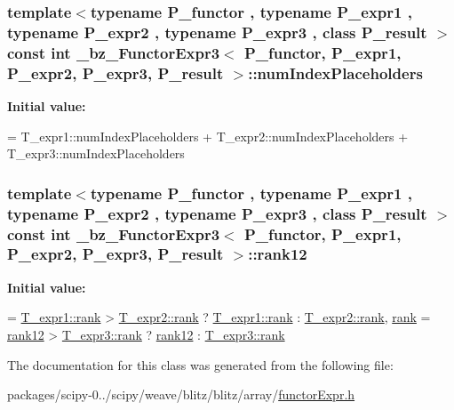 \subsubsection[{num\+Index\+Placeholders}]{\setlength{\rightskip}{0pt plus 5cm}template$<$typename P\+\_\+functor , typename P\+\_\+expr1 , typename P\+\_\+expr2 , typename P\+\_\+expr3 , class P\+\_\+result $>$ const int {\bf \+\_\+bz\+\_\+\+Functor\+Expr3}$<$ P\+\_\+functor, P\+\_\+expr1, P\+\_\+expr2, P\+\_\+expr3, P\+\_\+result $>$\+::num\+Index\+Placeholders\hspace{0.3cm}{\ttfamily [static]}}\label{class__bz__FunctorExpr3_a629b44040bfa7c287de36ccaf4a271ad}
{\bfseries Initial value\+:}
\begin{DoxyCode}
= T\_expr1::numIndexPlaceholders
                         + T\_expr2::numIndexPlaceholders
                         + T\_expr3::numIndexPlaceholders
\end{DoxyCode}
\hypertarget{class__bz__FunctorExpr3_a7587f3bcbc2d66a723cb9a62075b42fd}{}
\subsubsection[{rank12}]{\setlength{\rightskip}{0pt plus 5cm}template$<$typename P\+\_\+functor , typename P\+\_\+expr1 , typename P\+\_\+expr2 , typename P\+\_\+expr3 , class P\+\_\+result $>$ const int {\bf \+\_\+bz\+\_\+\+Functor\+Expr3}$<$ P\+\_\+functor, P\+\_\+expr1, P\+\_\+expr2, P\+\_\+expr3, P\+\_\+result $>$\+::rank12\hspace{0.3cm}{\ttfamily [static]}}\label{class__bz__FunctorExpr3_a7587f3bcbc2d66a723cb9a62075b42fd}
{\bfseries Initial value\+:}
\begin{DoxyCode}
= \hyperlink{zfftnd_8c_a6cfd95afd0afebd625b889fb6e58371c}{T\_expr1::rank} > \hyperlink{zfftnd_8c_a6cfd95afd0afebd625b889fb6e58371c}{T\_expr2::rank}
           ? \hyperlink{zfftnd_8c_a6cfd95afd0afebd625b889fb6e58371c}{T\_expr1::rank} : \hyperlink{zfftnd_8c_a6cfd95afd0afebd625b889fb6e58371c}{T\_expr2::rank},
    \hyperlink{zfftnd_8c_a6cfd95afd0afebd625b889fb6e58371c}{rank} = \hyperlink{class__bz__FunctorExpr3_a7587f3bcbc2d66a723cb9a62075b42fd}{rank12} > \hyperlink{zfftnd_8c_a6cfd95afd0afebd625b889fb6e58371c}{T\_expr3::rank} ? \hyperlink{class__bz__FunctorExpr3_a7587f3bcbc2d66a723cb9a62075b42fd}{rank12} : 
      \hyperlink{zfftnd_8c_a6cfd95afd0afebd625b889fb6e58371c}{T\_expr3::rank}
\end{DoxyCode}


The documentation for this class was generated from the following file\+:\begin{DoxyCompactItemize}
\item 
packages/scipy-\/0../scipy/weave/blitz/blitz/array/\hyperlink{functorExpr_8h}{functor\+Expr.\+h}\end{DoxyCompactItemize}
